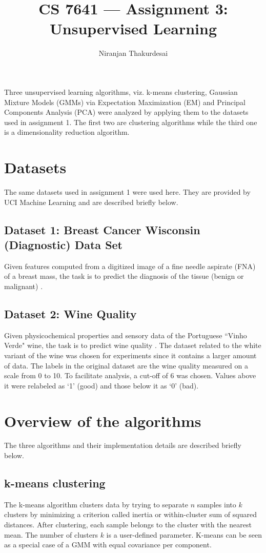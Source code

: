 \documentclass[letterpaper]{article}
\title{CS 7641 --- Assignment 3: Unsupervised Learning}
\author{Niranjan Thakurdesai}
\begin{document}
	\maketitle
	
	Three unsupervised learning algorithms, viz. k-means clustering, Gaussian Mixture Models (GMMs) via Expectation Maximization (EM) and Principal Components Analysis (PCA) were analyzed by applying them to the datasets used in assignment 1. The first two are clustering algorithms while the third one is a dimensionality reduction algorithm.
	
	\section{Datasets}
	The same datasets used in assignment 1 were used here. They are provided by UCI Machine Learning and are described briefly below.
	
	\subsection{Dataset 1: Breast Cancer Wisconsin (Diagnostic) Data Set}
	Given features computed from a digitized image of a fine needle aspirate (FNA) of a breast mass, the task is to predict the diagnosis of the tissue (benign or malignant) \cite{streetNuclearFeatureExtraction1993}.
	
	\subsection{Dataset 2: Wine Quality}
	Given physicochemical properties and sensory data of the Portuguese ``Vinho Verde" wine, the task is to predict wine quality \cite{cortezModelingWinePreferences2009}. The dataset related to the white variant of the wine was chosen for experiments since it contains a larger amount of data. The labels in the original dataset are the wine quality measured on a scale from 0 to 10. To facilitate analysis, a cut-off of 6 was chosen. Values above it were relabeled as ‘1’ (good) and those below it as ‘0’ (bad).
	
	\section{Overview of the algorithms}
	The three algorithms and their implementation details are described briefly below.
	
	\subsection{k-means clustering}
	The k-means algorithm clusters data by trying to separate $n$ samples into $k$ clusters by minimizing a criterion called inertia or within-cluster sum of squared distances. After clustering, each sample belongs to the cluster with the nearest mean. The number of clusters $k$ is a user-defined parameter. K-means can be seen as a special case of a GMM with equal covariance per component.
	
\end{document}
